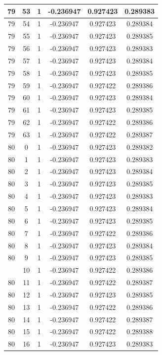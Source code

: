 \documentclass[12pt,a4paper]{article}
\numberwithin{equation}{section}
\numberwithin{figure}{section}
\numberwithin{table}{section}
\begin{document}
\begin{longtable}{|c|c|c|c|c|c|}
79 & 53 & 1 & -0.236947 & 0.927423 & 0.289383 \\ \hline
79 & 54 & 1 & -0.236947 & 0.927423 & 0.289384 \\ \hline
79 & 55 & 1 & -0.236947 & 0.927423 & 0.289385 \\ \hline
79 & 56 & 1 & -0.236947 & 0.927423 & 0.289383 \\ \hline
79 & 57 & 1 & -0.236947 & 0.927423 & 0.289384 \\ \hline
79 & 58 & 1 & -0.236947 & 0.927423 & 0.289385 \\ \hline
79 & 59 & 1 & -0.236947 & 0.927422 & 0.289386 \\ \hline
79 & 60 & 1 & -0.236947 & 0.927423 & 0.289384 \\ \hline
79 & 61 & 1 & -0.236947 & 0.927423 & 0.289385 \\ \hline
79 & 62 & 1 & -0.236947 & 0.927422 & 0.289386 \\ \hline
79 & 63 & 1 & -0.236947 & 0.927422 & 0.289387 \\ \hline
80 & 0 & 1 & -0.236947 & 0.927423 & 0.289382 \\ \hline
80 & 1 & 1 & -0.236947 & 0.927423 & 0.289383 \\ \hline
80 & 2 & 1 & -0.236947 & 0.927423 & 0.289384 \\ \hline
80 & 3 & 1 & -0.236947 & 0.927423 & 0.289385 \\ \hline
80 & 4 & 1 & -0.236947 & 0.927423 & 0.289383 \\ \hline
80 & 5 & 1 & -0.236947 & 0.927423 & 0.289384 \\ \hline
80 & 6 & 1 & -0.236947 & 0.927423 & 0.289385 \\ \hline
80 & 7 & 1 & -0.236947 & 0.927422 & 0.289386 \\ \hline
80 & 8 & 1 & -0.236947 & 0.927423 & 0.289384 \\ \hline
80 & 9 & 1 & -0.236947 & 0.927423 & 0.289385 \\ \hline
\pagebreak
80 & 10 & 1 & -0.236947 & 0.927422 & 0.289386 \\ \hline
80 & 11 & 1 & -0.236947 & 0.927422 & 0.289387 \\ \hline
80 & 12 & 1 & -0.236947 & 0.927423 & 0.289385 \\ \hline
80 & 13 & 1 & -0.236947 & 0.927422 & 0.289386 \\ \hline
80 & 14 & 1 & -0.236947 & 0.927422 & 0.289387 \\ \hline
80 & 15 & 1 & -0.236947 & 0.927422 & 0.289388 \\ \hline
80 & 16 & 1 & -0.236947 & 0.927423 & 0.289383 \\ \hline

\end{longtable}
\end{document}
